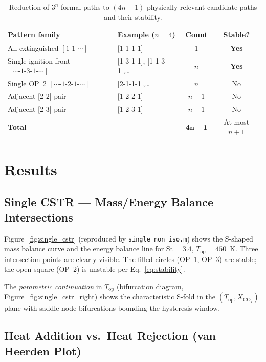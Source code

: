 \documentclass[11pt,a4paper]{article}
\newcommand{\Xco}{X_{\mathrm{CO_2}}}
\newcommand{\Top}{T_{\mathrm{op}}}
\newcommand{\St}{\mathrm{St}}
\begin{document}
\begin{table}[h!]
\centering
\caption{Reduction of $3^n$ formal paths to $(4n-1)$ physically relevant
         candidate paths and their stability.}
\label{tab:paths}
\renewcommand{\arraystretch}{1.18}
\begin{tabular}{@{}llcc@{}}
\toprule
Pattern family & Example ($n=4$) & Count & Stable? \\
\midrule
All extinguished $[1\text{-}1\text{-}\cdots]$ & [1-1-1-1] & 1 & \textbf{Yes} \\
Single ignition front $[\cdots\text{-}1\text{-}3\text{-}1\text{-}\cdots]$ & [1-3-1-1], [1-1-3-1],\ldots & $n$ & \textbf{Yes} \\
Single OP~2 $[\cdots\text{-}1\text{-}2\text{-}1\text{-}\cdots]$ & [2-1-1-1],\ldots & $n$ & No \\
Adjacent [2-2] pair & [1-2-2-1] & $n-1$ & No \\
Adjacent [2-3] pair & [1-2-3-1] & $n-1$ & No \\
\midrule
\textbf{Total} & & $\mathbf{4n-1}$ & At most $n+1$ \\
\bottomrule
\end{tabular}
\end{table}

\section{Results}
\label{sec:results}

\subsection{Single CSTR — Mass/Energy Balance Intersections}

Figure~\ref{fig:single_cstr} (reproduced by \texttt{single\_non\_iso.m})
shows the S-shaped mass balance curve and the energy balance line for
$\St=3.4$, $\Top=450$~K.  Three intersection points are clearly visible.
The filled circles (OP~1, OP~3) are stable; the open square (OP~2) is
unstable per Eq.~\eqref{eq:stability}.

The \textit{parametric continuation} in $\Top$ (bifurcation diagram,
Figure~\ref{fig:single_cstr}~right) shows the characteristic S-fold
in the $(\Top,\Xco)$ plane with saddle-node bifurcations bounding
the hysteresis window.

\subsection{Heat Addition vs.\ Heat Rejection (van Heerden Plot)}
\end{document}
